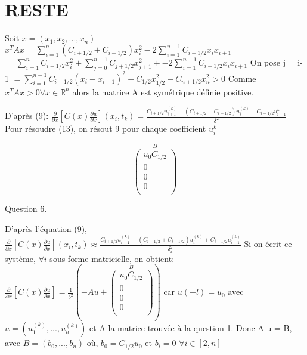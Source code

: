 \documentclass[a4paper,11pt]{article}
\newcommand{\R}{\mathbb{R}}
\begin{document}
\section{RESTE}

    Soit $x = (x_1, x_2, ... , x_n)$
    \newline
    $x^TAx = \sum\limits_{i = 1}^{n} (C_{i+1/2} + C_{i-1/2}) x_i^2 - 2 \sum\limits_{i = 1}^{n-1} C_{i+1/2} x_i x_{i+1} $
    \newline
    $ = \sum\limits_{i = 1}^{n} C_{i+1/2} x_i^2 + \sum\limits_{j = 0}^{n-1} C_{j+1/2} x_{j+1}^2  + - 2 \sum\limits_{i = 1}^{n-1} C_{i+1/2} x_i x_{i+1} $ On pose j = i-1
    \newline
    $ = \sum\limits_{i = 1}^{n-1} C_{i+1/2} (x_i - x_{i+1})^2 + C_{1/2} x_{1/2}^2 + C_{n + 1/2} x_{n}^2 > 0 $
    \newline
    Comme $x^TAx > 0 \forall x \in \R ^n $ alors la matrice A est symétrique définie positive.
    \newline

    D'après (9):
    $ \frac{\partial}{\partial x}[C(x)\frac{\partial u}{\partial x}](x_i, t_k) = \frac{
    C_{i+1/2}u_{i+1}^{(k)} - (C_{i+1/2} + C_{i-1/2})u_i^{(k)}+C_{i-1/2}u_{i-1}^{k}}{\delta^{2}}$
    Pour résoudre (13), on résout 9 pour chaque coefficient $u_i^{k}$

    $$
    \overset{B} {
        \begin{pmatrix}
            u_0 C_{1/2} \\
            0 \\
            0 \\
            0 \\
        \end{pmatrix}
    }
    $$

    Question 6.

    D'après l'équation (9),
    \newline
    $ \frac{\partial }{\partial x} [C(x)\frac{\partial u }{\partial x}](x_i, t_k) \approx \frac{C_{i+1/2}u_{i+1}^{(k)} - (C_{i+1/2} + C_{i-1/2})u_i^{(k)} + C_{i-1/2}u_{i-1}^{(k)}}{\delta_x^2} $
    \newline
    Si on écrit ce système, $\forall i $ sous forme matricielle, on obtient:
    \newline
    $ \frac{\partial }{\partial x} [C(x)\frac{\partial u }{\partial x}] = \frac{1}{\delta ^2} (-A u +
    \overset{B} {
        \begin{pmatrix}
            u_0 C_{1/2} \\
            0 \\
            0 \\
            0 \\
        \end{pmatrix}
    })$
    car $u(-l) = u_0$
    avec $u = (u_1^{(k)}, ... , u_n^{(k)}) $
    et A la matrice trouvée à la question 1.
    \newline
    Donc A u = B, avec $B = (b_0, ..., b_n)$
    où, $b_0 = C_{1/2} u_0$
    et $b_i = 0$  $\forall i \in [2, n] $
    \newline
\end{document}
